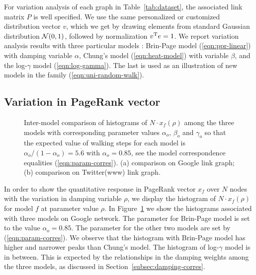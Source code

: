 \documentclass[conference]{IEEEtran}
\begin{document}

%
% 
For variation analysis of each graph in Table~\ref{tab:dataset}, the 
associated link matrix $P$ is well specified. We use the same personalized
or customized distribution vector $v$, which we get by drawing elements from 
standard Gaussian distribution ${\cal N}(0, 1)$, followed by 
normalization $v^{\rm T}e = 1$.
% 
We report variation analysis results with three particular models :
Brin-Page model (\ref{eqn:ppr-linear}) with damping variable $\alpha$,
Chung's model (\ref{eqn:heat-model}) with variable $\beta$, and the 
log-$\gamma$ model (\ref{eqn:log-gamma}). The last is used as an 
illustration of new models in the family (\ref{eqn:uni-random-walk}).

%


\subsection{Variation in PageRank vector} 
\label{subsec:intro-model-analysis}
%
%


\begin{figure}[!htb]
  \centering
  \caption{\footnotesize%
    Inter-model comparison of histograms of $N\cdot x_f(\rho)$ among the 
    three models with corresponding parameter values $\alpha_{o}$,
    $\beta_{o}$ and $\gamma_{o}$ so that the expected value of
    walking steps for each model is
    $ \alpha_{o}/(1-\alpha_{o})= 5.\dot{6} $ with $\alpha_{o} = 0.85$,
    see the model correspondence equalities (\ref{eqn:param-corres}).
    (a) comparison on Google link graph; (b) comparison on Twitter(www)
    link graph. }
\label{fig:unify-model-google}
\end{figure}


%
% 
In order to show the quantitative response in PageRank vector $x_f$
over $N$ nodes with the variation in damping variable $\rho$, we display
the histogram of $N\cdot x_f(\rho)$ for model $f$ at parameter value
$\rho$. In Figure~\ref{fig:unify-model-google} we show the
histograms associated with three models on Google network. The parameter for Brin-Page
model is set to the value $\alpha_{o} = 0.85$. The parameter for 
the other two models are set by (\ref{eqn:param-corres}).
%
We observe that the histogram with Brin-Page model has higher and narrower peaks
than Chung's model. The histogram of
log-$\gamma$ model is in between. This is expected by the relationships
in the damping weights among the three models, as discussed in
Section~\ref{subsec:damping-corres}.
\end{document}
